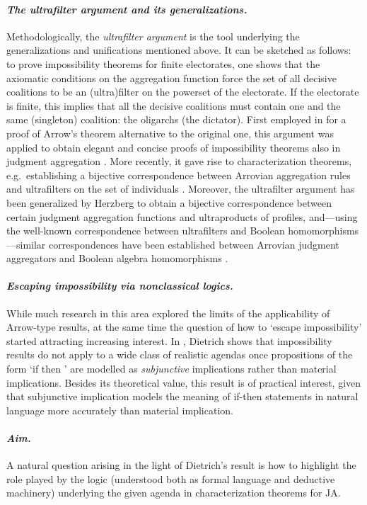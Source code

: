\documentclass{llncs}
\numberwithin{equation}{section}
\begin{document}
\paragraph{\bf\em The ultrafilter argument and its generalizations.} Methodologically, the {\em ultrafilter argument} is the tool underlying the generalizations and unifications mentioned above. It can be sketched as follows: to prove impossibility theorems for finite electorates, one shows that the axiomatic conditions on the aggregation function force the set of all decisive coalitions to be an (ultra)filter on the powerset of the electorate. If the electorate is finite, this implies that all the decisive coalitions must contain one and the same (singleton) coalition: the oligarchs (the dictator). First employed in \cite{KiSo72} for a proof of Arrow's theorem alternative to the original one, this argument was applied to obtain elegant and concise proofs of impossibility theorems also in judgment aggregation  \cite{DM10}. More recently, it gave rise to characterization theorems, e.g.\ establishing a bijective correspondence between Arrovian aggregation rules and ultrafilters on the set of individuals \cite{HE12}. Moreover,  the ultrafilter argument has been generalized by Herzberg \cite{He08} to obtain a bijective correspondence between certain judgment aggregation functions and ultraproducts of profiles, and---using the well-known correspondence between ultrafilters and Boolean homomorphisms---similar correspondences have been established between Arrovian judgment aggregators and Boolean algebra homomorphisms \cite{He10}.

\paragraph{\bf\em  Escaping impossibility via nonclassical logics.} While much research in this area explored the limits of the applicability of  Arrow-type results, at the same time the question of how to `escape impossibility' started attracting increasing interest. In \cite{Di10}, Dietrich shows that impossibility results do not apply to a wide class of realistic agendas
once propositions of the form `if  then ' are  modelled as {\em subjunctive} implications rather than material implications. Besides its theoretical value, this result is of practical interest, given that subjunctive implication models the meaning of if-then statements in natural language more accurately than  material implication.

\paragraph{\bf\em Aim.} A natural question arising in the light of Dietrich's result is how to highlight the role played by the logic (understood both as formal language and deductive machinery) underlying the given agenda in characterization theorems for JA.
\end{document}
